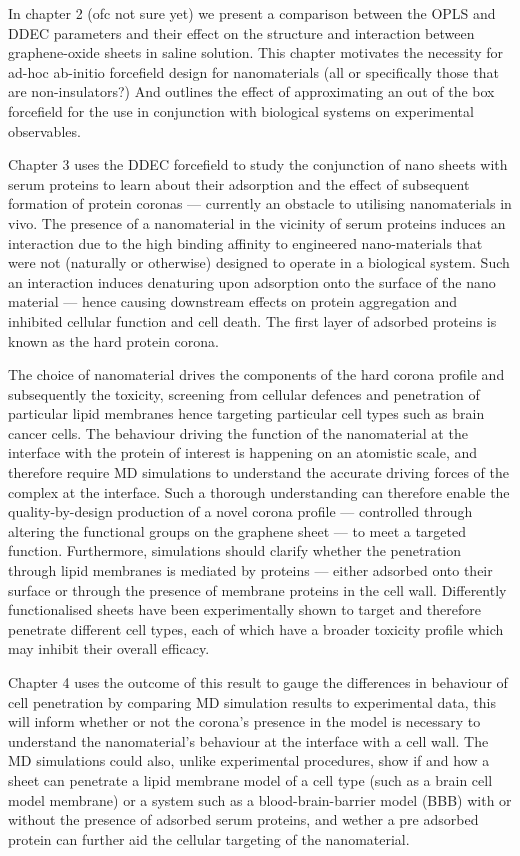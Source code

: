 In chapter 2 (ofc not sure yet) we present a comparison between the OPLS and DDEC parameters and their effect on the structure and interaction between graphene-oxide sheets in saline solution. This chapter motivates the necessity for ad-hoc ab-initio forcefield design for nanomaterials (all or specifically those that are non-insulators?) And outlines the effect of approximating an out of the box forcefield for the use in conjunction with biological systems on experimental observables. 

Chapter 3 uses the DDEC forcefield to study the conjunction of nano sheets with serum proteins to learn about their adsorption and the effect of subsequent formation of protein coronas — currently an obstacle to utilising nanomaterials in vivo. The presence of a nanomaterial in the vicinity of serum proteins induces an interaction due to the high binding affinity to engineered nano-materials that were not (naturally or otherwise) designed to operate in a biological system. Such an interaction induces denaturing upon adsorption onto the surface of the nano material — hence causing downstream effects on protein aggregation and inhibited cellular function and cell death. The first layer of adsorbed proteins is known as the hard protein corona.

The choice of nanomaterial drives the components of the hard corona profile and subsequently the toxicity, screening from cellular defences and penetration of particular lipid membranes hence targeting particular cell types such as brain cancer cells. The behaviour driving the function of the nanomaterial at the interface with the protein of interest is happening on an atomistic scale, and therefore require MD simulations to understand the accurate driving forces of the complex at the interface. Such a thorough understanding can therefore enable the quality-by-design production of a novel corona profile — controlled through altering the functional groups on the graphene sheet — to meet a targeted function. Furthermore, simulations should clarify whether the penetration through lipid membranes is mediated by proteins — either adsorbed onto their surface or through the presence of membrane proteins in the cell wall. Differently functionalised sheets have been experimentally shown to target and therefore penetrate different cell types, each of which have a broader toxicity profile which may inhibit their overall efficacy. 

Chapter 4 uses the outcome of this result to gauge the differences in behaviour of cell penetration by comparing MD simulation results to experimental data, this will inform whether or not the corona’s presence in the model is necessary to understand the nanomaterial’s behaviour at the interface with a cell wall. The MD simulations could also, unlike experimental procedures, show if and how a sheet can penetrate a lipid membrane model of a cell type (such as a brain cell model membrane) or a system such as a blood-brain-barrier model (BBB) with or without the presence of adsorbed serum proteins, and wether a pre adsorbed protein can further aid the cellular targeting of the nanomaterial. 

